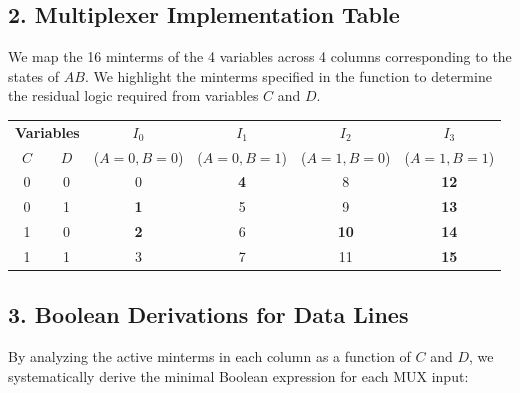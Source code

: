 \documentclass[12pt,a3paper]{article}
\begin{document}
\begin{enumerate}
\begin{tcolorbox}[enhanced,breakable,ansbox,colback=cD!4,colframe=cD,boxrule=0.8pt,arc=5pt,title={\textbf{Answer}},fonttitle=\bfseries\color{white},colbacktitle=cD]
\vspace{0.2cm}
\subsection*{2. Multiplexer Implementation Table}
We map the 16 minterms of the 4 variables across 4 columns corresponding to the states of $AB$. We highlight the minterms specified in the function to determine the residual logic required from variables $C$ and $D$.

\begin{center}
\renewcommand{\arraystretch}{1.3}
\begin{tabular}{c c | c | c | c | c}
\toprule
\multicolumn{2}{c|}{\textbf{Variables}} & \textbf{$I_0$} & \textbf{$I_1$} & \textbf{$I_2$} & \textbf{$I_3$} \\
$C$ & $D$ & ($A=0, B=0$) & ($A=0, B=1$) & ($A=1, B=0$) & ($A=1, B=1$) \\
\midrule
0 & 0 & 0 & \textcolor{cD}{\textbf{4}} & 8 & \textcolor{cD}{\textbf{12}} \\
0 & 1 & \textcolor{cD}{\textbf{1}} & 5 & 9 & \textcolor{cD}{\textbf{13}} \\
1 & 0 & \textcolor{cD}{\textbf{2}} & 6 & \textcolor{cD}{\textbf{10}} & \textcolor{cD}{\textbf{14}} \\
1 & 1 & 3 & 7 & 11 & \textcolor{cD}{\textbf{15}} \\
\bottomrule
\end{tabular}
\end{center}

\vspace{0.2cm}
\subsection*{3. Boolean Derivations for Data Lines}
By analyzing the active minterms in each column as a function of $C$ and $D$, we systematically derive the minimal Boolean expression for each MUX input:


\end{tcolorbox}
\end{enumerate}
\end{document}
